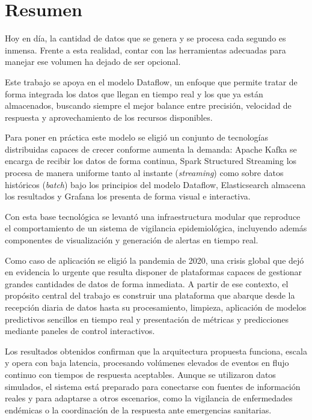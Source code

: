 \documentclass[12pt,a4paper]{article}
\begin{document}
\section*{Resumen}

Hoy en día, la cantidad de datos que se genera y se procesa cada segundo es inmensa. Frente a esta realidad, contar con las herramientas adecuadas para manejar ese volumen ha dejado de ser opcional.

Este trabajo se apoya en el modelo Dataflow, un enfoque que permite tratar de forma integrada los datos que llegan en tiempo real y los que ya están almacenados, buscando siempre el mejor balance entre precisión, velocidad de respuesta y aprovechamiento de los recursos disponibles.

Para poner en práctica este modelo se eligió un conjunto de tecnologías distribuidas capaces de crecer conforme aumenta la demanda: Apache Kafka se encarga de recibir los datos de forma continua, Spark Structured Streaming los procesa de manera uniforme tanto al instante (\emph{streaming}) como sobre datos históricos (\emph{batch}) bajo los principios del modelo Dataflow, Elasticsearch almacena los resultados y Grafana los presenta de forma visual e interactiva.

Con esta base tecnológica se levantó una infraestructura modular que reproduce el comportamiento de un sistema de vigilancia epidemiológica, incluyendo además componentes de visualización y generación de alertas en tiempo real.

Como caso de aplicación se eligió la pandemia de 2020, una crisis global que dejó en evidencia lo urgente que resulta disponer de plataformas capaces de gestionar grandes cantidades de datos de forma inmediata. A partir de ese contexto, el propósito central del trabajo es construir una plataforma que abarque desde la recepción diaria de datos hasta su procesamiento, limpieza, aplicación de modelos predictivos sencillos en tiempo real y presentación de métricas y predicciones mediante paneles de control interactivos.

Los resultados obtenidos confirman que la arquitectura propuesta funciona, escala y opera con baja latencia, procesando volúmenes elevados de eventos en flujo continuo con tiempos de respuesta aceptables. Aunque se utilizaron datos simulados, el sistema está preparado para conectarse con fuentes de información reales y para adaptarse a otros escenarios, como la vigilancia de enfermedades endémicas o la coordinación de la respuesta ante emergencias sanitarias.
\end{document}
